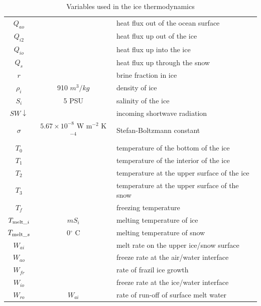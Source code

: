 \begin{table}
{\begin{tabular}{|c|c|l|}
  $Q_{ao}$ && heat flux out of the ocean surface \\
  $Q_{i2}$ && heat flux up out of the ice \\
  $Q_{io}$ && heat flux up into the ice \\
  $Q_{s}$  && heat flux up through the snow \\
  $r$   && brine fraction in ice \\
  $\rho_i$ & 910 $m^3/kg$ & density of ice \\
  $S_i$ & 5 PSU & salinity of the ice \\
  $SW\!\!\downarrow$ && incoming shortwave radiation \\
  $\sigma$ & $5.67 \times 10^{-8}$ W m$^{-2}$ K$^{-4}$ &
  Stefan-Boltzmann constant \\
  $T_0$ && temperature of the bottom of the ice \\
  $T_1$ && temperature of the interior of the ice \\
  $T_2$ && temperature at the upper surface of the ice \\
  $T_3$ && temperature at the upper surface of the snow \\
  $T_f$ && freezing temperature \\
  $T_{{\rm melt}\_i}$ & $mS_i$ & melting temperature of ice \\
  $T_{{\rm melt}\_s}$ & 0$^\circ$ C & melting temperature of snow \\
  $W_{ai}$ && melt rate on the upper ice/snow surface \\
  $W_{ao}$ && freeze rate at the air/water interface \\
  $W_{fr}$ && rate of frazil ice growth \\
  $W_{io}$ && freeze rate at the ice/water interface \\
  $W_{ro}$ & $W_{ai}$ & rate of run-off of surface melt water \\
  \hline
\end{tabular}
}
\caption{Variables used in the ice thermodynamics}
\label{thermvar}
\end{table}

